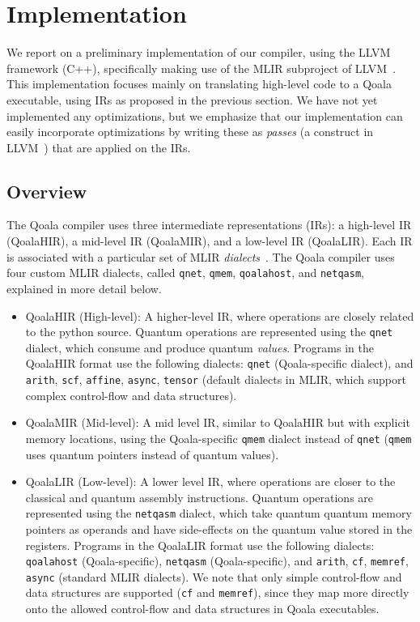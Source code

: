 \section{Implementation}

We report on a preliminary implementation of our compiler, using the LLVM framework (C++), specifically making use of the MLIR subproject of LLVM~\cite{lattner_mlir_2020}.
This implementation focuses mainly on translating high-level code to a Qoala executable, using \acf{IR}s as proposed in the previous section.
We have not yet implemented any optimizations, but we emphasize that our implementation can easily incorporate optimizations by writing these as \emph{passes} (a construct in LLVM~\cite{lattner_llvm_2004}) that are applied on the IRs.

\subsection{Overview}
The Qoala compiler uses three intermediate representations (IRs):
a high-level IR (QoalaHIR), a mid-level IR (QoalaMIR), and a low-level IR (QoalaLIR).
Each IR is associated with a particular set of MLIR \emph{dialects}~\cite{lattner_mlir_2020}.
The Qoala compiler uses four custom MLIR dialects, called \texttt{qnet}, \texttt{qmem}, \texttt{qoalahost}, and \texttt{netqasm}, explained in more detail below.

\begin{itemize}
    \item QoalaHIR (High-level): A higher-level IR, where operations are closely related
    to the python source.
    Quantum operations are represented using the \texttt{qnet} dialect, which consume and produce quantum \emph{values}.
    Programs in the QoalaHIR format use the following dialects: \texttt{qnet} (Qoala-specific dialect), and \texttt{arith}, \texttt{scf}, \texttt{affine}, \texttt{async}, \texttt{tensor} (default dialects in MLIR, which support complex control-flow and data structures).
    \item QoalaMIR (Mid-level): A mid level IR, similar to QoalaHIR but with explicit memory locations, using the Qoala-specific \texttt{qmem} dialect instead of \texttt{qnet} (\texttt{qmem} uses quantum pointers instead of quantum values).
    \item QoalaLIR (Low-level): A lower level IR, where operations are closer to the classical and quantum assembly instructions.
    Quantum operations are represented using the \texttt{netqasm} dialect, which take quantum quantum memory pointers as operands and have side-effects on the quantum value stored in the registers.
    Programs in the QoalaLIR format use the following dialects: \texttt{qoalahost} (Qoala-specific), \texttt{netqasm} (Qoala-specific), and \texttt{arith}, \texttt{cf}, \texttt{memref}, \texttt{async} (standard MLIR dialects).
    We note that only simple control-flow and data structures are supported (\texttt{cf} and \texttt{memref}), since they map more directly onto the allowed control-flow and data structures in Qoala executables.
\end{itemize}

